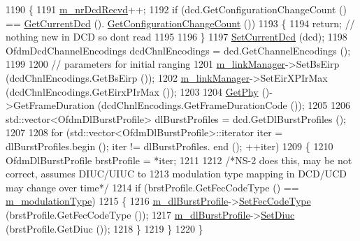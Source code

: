 \begin{DoxyCode}
1190 \{
1191   \hyperlink{classns3_1_1SubscriberStationNetDevice_a54cd018b94e92b304eeac4c1ecf6a3ef}{m\_nrDcdRecvd}++;
1192   \textcolor{keywordflow}{if} (dcd.GetConfigurationChangeCount () == \hyperlink{classns3_1_1WimaxNetDevice_ae8dcb382dcc6c34beb0d101d87b05598}{GetCurrentDcd} ().
      \hyperlink{classns3_1_1Dcd_a2ea8bbec4eb301581eeb68e346c48e35}{GetConfigurationChangeCount} ())
1193     \{
1194       \textcolor{keywordflow}{return}; \textcolor{comment}{// nothing new in DCD so dont read}
1195 
1196     \}
1197   \hyperlink{classns3_1_1WimaxNetDevice_ab117daf48e12811b746173822f3869dd}{SetCurrentDcd} (dcd);
1198   OfdmDcdChannelEncodings dcdChnlEncodings = dcd.GetChannelEncodings ();
1199 
1200   \textcolor{comment}{// parameters for initial ranging}
1201   \hyperlink{classns3_1_1SubscriberStationNetDevice_a24e7df59fb312c196318f0366b63c6e6}{m\_linkManager}->SetBsEirp (dcdChnlEncodings.GetBsEirp ());
1202   \hyperlink{classns3_1_1SubscriberStationNetDevice_a24e7df59fb312c196318f0366b63c6e6}{m\_linkManager}->SetEirXPIrMax (dcdChnlEncodings.GetEirxPIrMax ());
1203 
1204   \hyperlink{classns3_1_1WimaxNetDevice_a81c1f9d43acfc9cd5d642b784102a21f}{GetPhy} ()->GetFrameDuration (dcdChnlEncodings.GetFrameDurationCode ());
1205 
1206   std::vector<OfdmDlBurstProfile> dlBurstProfiles = dcd.GetDlBurstProfiles ();
1207 
1208   \textcolor{keywordflow}{for} (std::vector<OfdmDlBurstProfile>::iterator iter = dlBurstProfiles.begin (); iter != dlBurstProfiles.
      end (); ++iter)
1209     \{
1210       OfdmDlBurstProfile brstProfile = *iter;
1211 
1212       \textcolor{comment}{/*NS-2 does this, may be not correct, assumes DIUC/UIUC to}
1213 \textcolor{comment}{       modulation type mapping in DCD/UCD may change over time*/}
1214       \textcolor{keywordflow}{if} (brstProfile.GetFecCodeType () == \hyperlink{classns3_1_1SubscriberStationNetDevice_a51692a2abe6860fa3b7d7cd8960df8d1}{m\_modulationType})
1215         \{
1216           \hyperlink{classns3_1_1SubscriberStationNetDevice_ae317088c484842775e3ec776e34ecec7}{m\_dlBurstProfile}->\hyperlink{classns3_1_1OfdmDlBurstProfile_a820825183214aaa1c788ea3a1f3b240d}{SetFecCodeType} (brstProfile.GetFecCodeType ());
1217           \hyperlink{classns3_1_1SubscriberStationNetDevice_ae317088c484842775e3ec776e34ecec7}{m\_dlBurstProfile}->\hyperlink{classns3_1_1OfdmDlBurstProfile_ae3d4ef4e16c600092b10354749fb6d2f}{SetDiuc} (brstProfile.GetDiuc ());
1218         \}
1219     \}
1220 \}
\end{DoxyCode}


